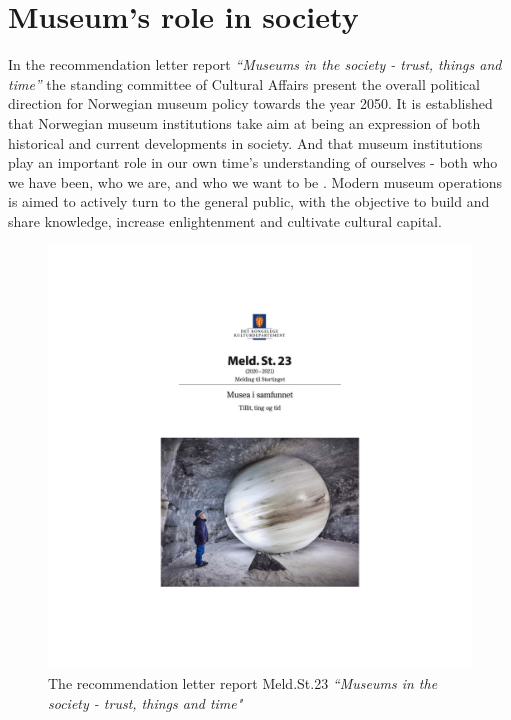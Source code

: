 
\section{Museum's role in society}

In the recommendation letter report \emph{“Museums in the society - trust, things and time”} the standing committee of Cultural Affairs present the overall political direction for Norwegian museum policy towards the year 2050. It is established that Norwegian museum institutions take aim at being an expression of both historical and current developments in society. And that museum institutions play an important role in our own time’s understanding of ourselves - both who we have been, who we are, and who we want to be \autocite[p. 7]{melding23}. Modern museum operations is aimed to actively turn to the general public, with the objective to build and share knowledge, increase enlightenment and cultivate cultural capital.

\begin{figure}[h]
\includegraphics[width=12cm]{pictures/stortingsmelding.jpg}
\caption{The recommendation letter report Meld.St.23 \emph{“Museums in the society - trust, things and time"}}
\centering 
\end{figure}

